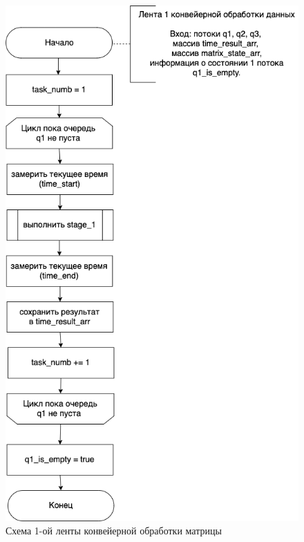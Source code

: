 \documentclass[a4paper,14pt, unknownkeysallowed]{extreport}
\begin{document}
\begin{figure}[h]
	\centering
	\includegraphics[scale=0.6]{img/parallel_stage_1.png}
	\caption{Схема 1-ой ленты конвейерной обработки матрицы}
	\label{fig:parallel_stage_1}
\end{figure} 

\clearpage
\end{document}
